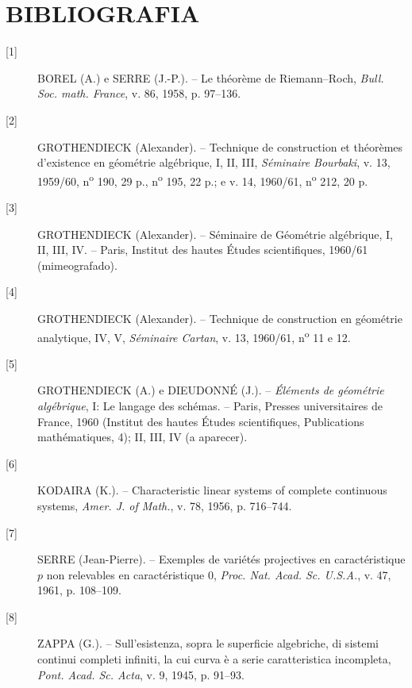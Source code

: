 \section*{BIBLIOGRAFIA}

\begin{description}
\item[{[1]}] BOREL (A.) e SERRE (J.-P.). -- Le théorème de Riemann--Roch,
\emph{Bull. Soc. math. France}, v. 86, 1958, p. 97--136.

\item[{[2]}] GROTHENDIECK (Alexander). -- Technique de construction et
théorèmes d'existence en géométrie algébrique, I, II, III, \emph{Séminaire
Bourbaki}, v. 13, 1959/60, n\textsuperscript{o} 190, 29 p.,
n\textsuperscript{o} 195, 22 p.; e v. 14, 1960/61,
n\textsuperscript{o} 212, 20 p.

\item[{[3]}] GROTHENDIECK (Alexander). -- Séminaire de Géométrie algébrique,
I, II, III, IV. -- Paris, Institut des hautes Études scientifiques, 1960/61
(mimeografado).

\item[{[4]}] GROTHENDIECK (Alexander). -- Technique de construction en
géométrie analytique, IV, V, \emph{Séminaire Cartan}, v. 13, 1960/61,
n\textsuperscript{o} 11 e 12.

\item[{[5]}] GROTHENDIECK (A.) e DIEUDONNÉ (J.). -- \emph{Éléments de
géométrie algébrique}, I: Le langage des schémas. -- Paris, Presses
universitaires de France, 1960 (Institut des hautes Études scientifiques,
Publications mathématiques, 4); II, III, IV (a aparecer).

\item[{[6]}] KODAIRA (K.). -- Characteristic linear systems of complete
continuous systems, \emph{Amer. J. of Math.}, v. 78, 1956, p. 716--744.

\item[{[7]}] SERRE (Jean-Pierre). -- Exemples de variétés projectives en
caractéristique $p$ non relevables en caractéristique 0, \emph{Proc. Nat. Acad.
Sc. U.S.A.}, v. 47, 1961, p. 108--109.

\item[{[8]}] ZAPPA (G.). -- Sull'esistenza, sopra le superficie algebriche, di
sistemi continui completi infiniti, la cui curva è a serie caratteristica
incompleta, \emph{Pont. Acad. Sc. Acta}, v. 9, 1945, p. 91--93.
\end{description}

